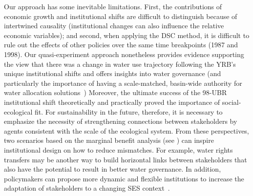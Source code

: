 
Our approach has some inevitable limitations.
First, the contributions of economic growth and institutional shifts are difficult to distinguish because of intertwined causality (institutional changes can also influence the relative economic variables);
and second, when applying the DSC method, it is difficult to rule out the effects of other policies over the same time breakpoints (1987 and 1998).
Our quasi-experiment approach nonetheless provides evidence supporting the view that there was a change in water use trajectory following the YRB's unique institutional shifts and offers insights into water governance (and particularly the importance of having a scale-matched, basin-wide authority for water allocation solutions~\cite{bodin2017b, ostrom2009, reyers2018})
Moreover, the ultimate success of the 98-UBR institutional shift theoretically and practically proved the importance of social-ecological fit.
For sustainability in the future, therefore, it is necessary to emphasize the necessity of strengthening connections between stakeholders by agents consistent with the scale of the ecological system.
From these perspectives, two scenarios based on the marginal benefit analysis (see \textit{}) can inspire institutional design on how to reduce mismatches.
For example, water rights transfers may be another way to build horizontal links between stakeholders that also have the potential to result in better water governance.
In addition, policymakers can propose more dynamic and flexible institutions to increase the adaptation of stakeholders to a changing SES context~\cite{reyers2018}.

